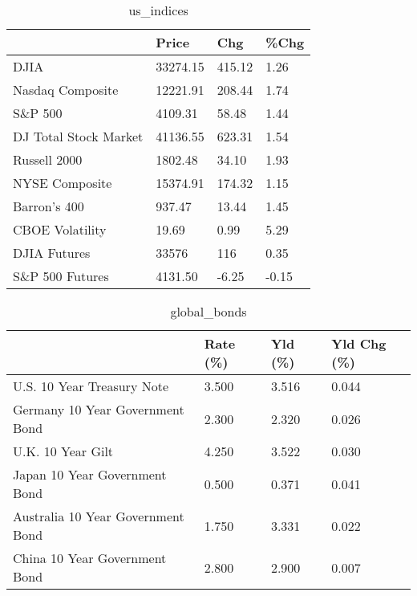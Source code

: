 \documentclass{article}%
\begin{document}
%


\begin{table}[htbp]%
\caption{us\_indices}%
\centering%
\begin{adjustbox}{width=1\textwidth}%
\begin{tabular}{llll}
\toprule
                      &    Price &    Chg &  \%Chg \\
\midrule
                 DJIA & 33274.15 & 415.12 &  1.26 \\
     Nasdaq Composite & 12221.91 & 208.44 &  1.74 \\
              S\&P 500 &  4109.31 &  58.48 &  1.44 \\
DJ Total Stock Market & 41136.55 & 623.31 &  1.54 \\
         Russell 2000 &  1802.48 &  34.10 &  1.93 \\
       NYSE Composite & 15374.91 & 174.32 &  1.15 \\
         Barron's 400 &   937.47 &  13.44 &  1.45 \\
      CBOE Volatility &    19.69 &   0.99 &  5.29 \\
         DJIA Futures &    33576 &    116 &  0.35 \\
      S\&P 500 Futures &  4131.50 &  -6.25 & -0.15 \\
\bottomrule
\end{tabular}
%
\end{adjustbox}%
\end{table}

%


\begin{table}[htbp]%
\caption{global\_bonds}%
\centering%
\begin{adjustbox}{width=1\textwidth}%
\begin{tabular}{llll}
\toprule
                                  & Rate (\%) & Yld (\%) & Yld Chg (\%) \\
\midrule
       U.S. 10 Year Treasury Note &    3.500 &   3.516 &       0.044 \\
  Germany 10 Year Government Bond &    2.300 &   2.320 &       0.026 \\
                U.K. 10 Year Gilt &    4.250 &   3.522 &       0.030 \\
    Japan 10 Year Government Bond &    0.500 &   0.371 &       0.041 \\
Australia 10 Year Government Bond &    1.750 &   3.331 &       0.022 \\
    China 10 Year Government Bond &    2.800 &   2.900 &       0.007 \\
\bottomrule
\end{tabular}
%
\end{adjustbox}%
\end{table}
\end{document}
